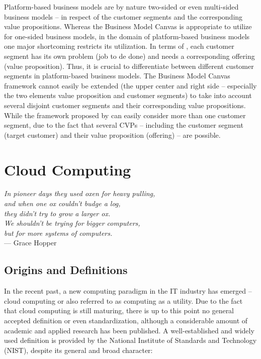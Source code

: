 Platform-based business models are by nature two-sided or even multi-sided business models -- in respect of the customer segments and the corresponding value propositions. Whereas the Business Model Canvas is appropriate to utilize for one-sided business models, in the domain of platform-based business models one major shortcoming restricts its utilization. In terms of \citet{Johnson2008}, each customer segment has its own problem (job to de done) and needs a corresponding offering (value proposition). Thus, it is crucial to differentiate between different customer segments in platform-based business models. The Business Model Canvas framework cannot easily be extended (the upper center and right side -- especially the two elements value proposition and customer segments) to take into account several disjoint customer segments and their corresponding value propositions. While the framework proposed by \citet{Johnson2008} can easily consider more than one customer segment, due to the fact that several \acp{CVP} -- including the customer segment (target customer) and their value proposition (offering) -- are possible.

\section{Cloud Computing}\label{ch:tf:paas}
\begin{flushright}{\slshape 
	In pioneer days they used oxen for heavy pulling,\\
	and when one ox couldn't budge a log,\\
	they didn't try to grow a larger ox.\\
	We shouldn't be trying for bigger computers,\\
	but for more systems of computers.} \\ \medskip
	--- Grace Hopper
\end{flushright}

\subsection{Origins and Definitions}

In the recent past, a new computing paradigm in the IT industry has emerged -- cloud computing or also referred to as computing as a utility. Due to the fact that cloud computing is still maturing, there is up to this point no general accepted definition or even standardization, although a considerable amount of academic and applied research has been published. A well-established and widely used definition is provided by the National Institute of Standards and Technology (NIST), despite its general and broad character:

